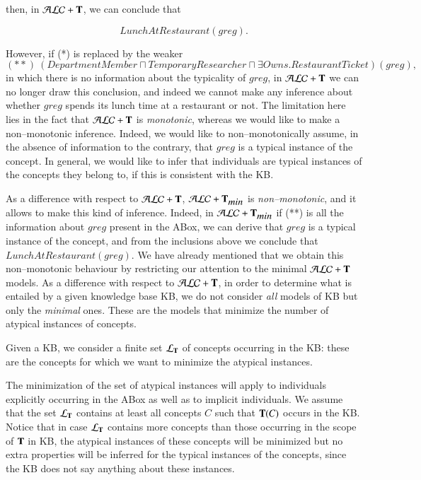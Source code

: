 \documentclass[a4paper, 11pt, oneside]{elsarticle}
\newcommand{\tip}{{\bf T}}
\newcommand{\alct}{\mathcal{ALC}+\tip}
\newcommand{\alctmin}{\mathcal{ALC}+\tip_{\mbox{\em min}}}
\newcommand{\ellet} {\mathcal{L}_{\bf T}}
\begin{document}
\noindent then, in $\alct$, we can conclude that

$$\mathit{LunchAtRestaurant(\mathit{greg})}.$$

\noindent However, if (*) is replaced by the weaker
$$(**)  \ (\mathit{DepartmentMember} \sqcap \mathit{TemporaryResearcher} \sqcap \exists \mathit{Owns}.\mathit{RestaurantTicket})(\mathit{greg}),$$ in which
there is no information about the typicality of $\mathit{greg}$,
in $\alct$ we can no longer draw this conclusion, and indeed we
cannot make any inference about whether $\mathit{greg}$ spends its
lunch time at a restaurant or not. The limitation here lies in the
fact that $\alct$ is {\em monotonic}, whereas we would like to
make a non--monotonic inference. Indeed, we would like to
non--monotonically assume, in the absence of information to the
contrary, that $\mathit{greg}$ is a typical instance of the
concept. In general, we would like to infer that individuals are
typical instances of the concepts they belong to, if this is
consistent with the KB.

As a difference with respect to $\alct$, $\alctmin$ is {\em non--monotonic}, and it allows to make this kind of inference. Indeed, in $\alctmin$ if (**) is all the information about $\mathit{greg}$ present in the ABox, we can derive that $\mathit{greg}$ is a typical instance of the concept, and from the inclusions above we conclude that $\mathit{LunchAtRestaurant(\mathit{greg})}.$
 We have already mentioned that we obtain this non--monotonic behaviour by restricting our attention to the  minimal $\alct$ models. As a difference with respect to $\alct$,
 in order to determine what is entailed by  a given knowledge base KB, we do not consider {\em all} models of KB but only the {\em minimal} ones. These are the models that minimize the number of atypical instances of  concepts.

Given a KB, we consider a finite set $\ellet$ of concepts
occurring in the KB: these are the concepts for which we want to
minimize the atypical instances.

The minimization of the set of atypical instances will apply to
individuals explicitly occurring in the ABox as well as to
implicit individuals. We assume that the set $\ellet$ contains at
least all concepts $C$ such that $\tip(C)$ occurs in the KB.
Notice that in case $\ellet$ contains more concepts than
those occurring in the scope of $\tip$ in KB, the atypical
instances of these concepts will be minimized but no extra
properties will be inferred for the typical instances of the
concepts, since the KB does not say anything about these
instances.
\end{document}
